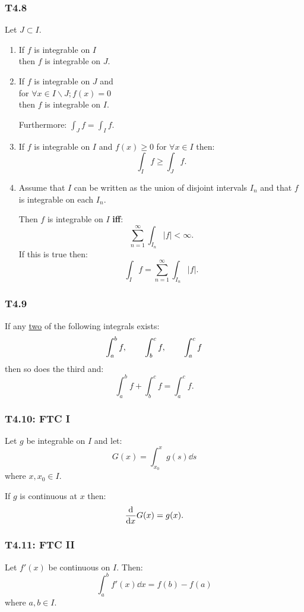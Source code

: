 \documentclass{article}
\begin{document}
\begin{multicols*}{3}
\subsubsection*{T4.8}
Let $J\subset I$.
\begin{enumerate}
    \item If $f$ is integrable on $I$ \\
    then $f$ is integrable on $J$.

    \item If $f$ is integrable on $J$
    and \\ for $\forall x\in I\backslash J; f(x)=0$ \\
    then $f$ is integrable on $I$.

    Furthermore: $\displaystyle\int_J f=\int_I f$.

    \item If $f$ is integrable on $I$ and
    $f(x)\geq0$ for $\forall x\in I$ then:
    $$\int_I f\geq\int_J f.$$

    \item Assume that $I$ can be written as the union
    of disjoint intervals $I_n$ and that
    $f$ is integrable on each $I_n$.

    Then $f$ is integrable on $I$ \textbf{if{}f}:
    $$\sum_{n=1}^{\infty}\int_{I_n}|f|<\infty.$$
    If this is true then:
    $$\int_I f=\sum_{n=1}^{\infty}\int_{I_n}|f|.$$
\end{enumerate}

\subsubsection*{T4.9}
If any \underline{two} of the following integrals exists:
$$\int_{a}^{b}f,\hspace*{0.3in}
\int_{b}^{c}f,\hspace*{0.3in}
\int_{a}^{c}f$$
then so does the third and:
$$\int_{a}^{b}f+\int_{b}^{c}f=\int_{a}^{c}f.$$

\subsubsection*{T4.10: FTC I}
Let $g$ be integrable on $I$ and let:
$$G(x)=\int_{x_0}^{x}g(s)\dd s$$
where $x,x_0\in I$.

If $g$ is continuous at $x$ then:
$$\dv{x}G(x)=g(x).$$

\subsubsection*{T4.11: FTC II}
Let $f'(x)$ be continuous on $I$. Then:
$$\int_{a}^{b}f'(x)\dd x=f(b)-f(a)$$
where $a,b\in I$.


\end{multicols*}
\end{document}
